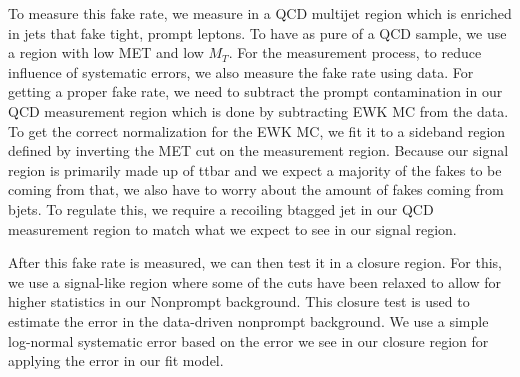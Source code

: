 To measure this fake rate, we measure in a QCD multijet region which is enriched in jets that fake tight, prompt leptons. To have as pure of a QCD sample, we use a region with low MET and low $M_{T}$. For the measurement process, to reduce influence of systematic errors, we also measure the fake rate using data. For getting a proper fake rate, we need to subtract the prompt contamination in our QCD measurement region which is done by subtracting EWK MC from the data. To get the correct normalization for the EWK MC, we fit it to a sideband region defined by inverting the MET cut on the measurement region. Because our signal region is primarily made up of ttbar and we expect a majority of the fakes to be coming from that, we also have to worry about the amount of fakes coming from bjets. To regulate this, we require a recoiling btagged jet in our QCD measurement region to match what we expect to see in our signal region.

After this fake rate is measured, we can then test it in a closure region. For this, we use a signal-like region where some of the cuts have been relaxed to allow for higher statistics in our Nonprompt background. This closure test is used to estimate the error in the data-driven nonprompt background. We use a simple log-normal systematic error based on the error we see in our closure region for applying the error in our fit model.



